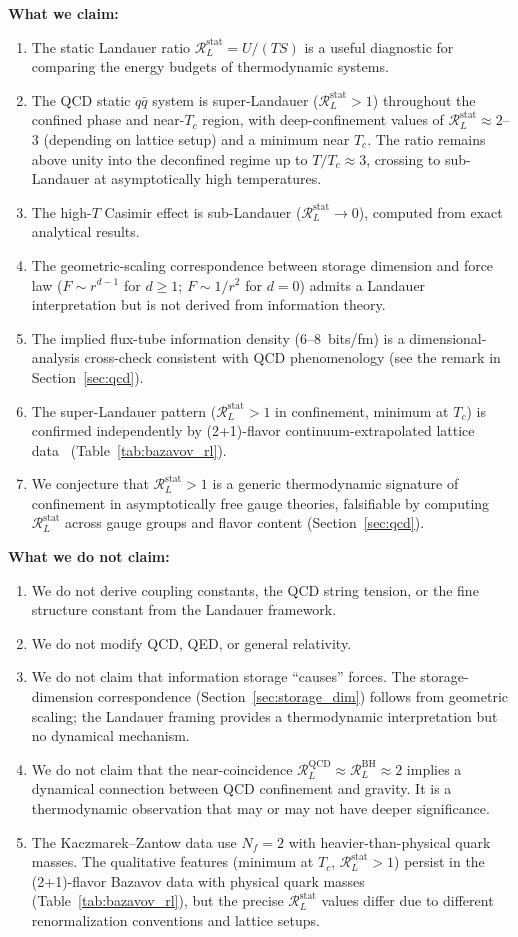 \documentclass[%
 aip,
 amsmath,amssymb,
 reprint,%
]{revtex4-2}
\newcommand{\RLs}{\mathcal{R}_L^{\mathrm{stat}}}
\begin{document}
\textbf{What we claim:}
\begin{enumerate}
\item The static Landauer ratio $\RLs = U/(TS)$ is a useful
diagnostic for comparing the energy budgets of thermodynamic systems.
\item The QCD static $q\bar{q}$ system is super-Landauer
($\RLs > 1$) throughout the confined phase and near-$T_c$
region, with deep-confinement values of
$\RLs \approx 2$--$3$ (depending on lattice setup) and a
minimum near $T_c$.  The ratio remains above unity into the
deconfined regime up to $T/T_c \approx 3$, crossing to
sub-Landauer at asymptotically high temperatures.
\item The high-$T$ Casimir effect is sub-Landauer
($\RLs \to 0$), computed from exact analytical results.
\item The geometric-scaling correspondence between storage
dimension and force law ($F \sim r^{d-1}$ for $d \geq 1$;
$F \sim 1/r^2$ for $d = 0$) admits a Landauer
interpretation but is not derived from information theory.
\item The implied flux-tube information density ($6$--$8$~bits/fm) is
a dimensional-analysis cross-check consistent with QCD phenomenology
(see the remark in Section~\ref{sec:qcd}).
\item The super-Landauer pattern ($\RLs > 1$ in confinement,
minimum at $T_c$) is confirmed independently by (2+1)-flavor
continuum-extrapolated lattice data~\cite{Bazavov2016}
(Table~\ref{tab:bazavov_rl}).
\item We conjecture that $\RLs > 1$ is a generic thermodynamic
signature of confinement in asymptotically free gauge theories,
falsifiable by computing $\RLs$ across gauge groups and flavor
content (Section~\ref{sec:qcd}).
\end{enumerate}

\textbf{What we do not claim:}
\begin{enumerate}
\item We do not derive coupling constants, the QCD string tension,
or the fine structure constant from the Landauer framework.
\item We do not modify QCD, QED, or general relativity.
\item We do not claim that information storage ``causes'' forces.
The storage-dimension correspondence (Section~\ref{sec:storage_dim})
follows from geometric scaling; the Landauer framing provides a
thermodynamic interpretation but no dynamical mechanism.
\item We do not claim that the near-coincidence
$\mathcal{R}_L^{\mathrm{QCD}} \approx \mathcal{R}_L^{\mathrm{BH}}
\approx 2$ implies a dynamical connection between QCD confinement
and gravity.  It is a thermodynamic observation that may or may not
have deeper significance.
\item The Kaczmarek--Zantow data use $N_f = 2$ with heavier-than-physical
quark masses.  The qualitative features (minimum at $T_c$,
$\RLs > 1$) persist in the (2+1)-flavor Bazavov data with
physical quark masses (Table~\ref{tab:bazavov_rl}), but the
precise $\RLs$ values differ due to different renormalization
conventions and lattice setups.
\end{enumerate}
\end{document}
